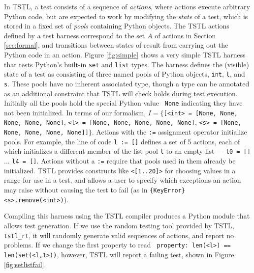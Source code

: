 In TSTL, a test consists of a sequence of
\emph{actions}, where actions execute arbitrary Python code, but are
expected to work by modifying the \emph{state} of a test, which is
stored in a fixed set of \emph{pools} containing Python objects.  The
TSTL actions defined by a test harness correspond to the set $A$ of
actions in Section \ref{sec:formal}, and transitions between states of
result from carrying out the Python code in an action.  Figure
\ref{fig:simple} shows a very simple TSTL harness that tests Python's
built-in {\tt set} and {\tt list} types.  The harness defines the
(visible) state of a test as consisting of three named pools of Python
objects, {\tt int}, {\tt l}, and {\tt s}.  These pools have no
inherent associated type, though a type can be annotated as an
additional constraint that TSTL will check holds during test
execution.  Initially all the pools hold the special Python value {\tt
  None} indicating they have not been initialized.  In terms of our formalism,
$I = \{${\tt [<int> = [None, None, None, None, None]}, {\tt <l> =
  [None, None, None, None, None]}, {\tt <s> = [None, None, None, None,
  None]]}$\}$.  Actions with the {\tt :=} assignment operator
initialize pools.  For example, the line of code {\tt l := []} defines a set of 5
actions, each of which initializes a different member of the list pool
{\tt l} to an empty list --- {\tt l0 = []} ... {\tt l4 = []}.  Actions
without a {\tt :=} require that pools used in them already be
initialized.  TSTL provides constructs like {\tt <[1..20]>} for
choosing values in a range for use in a test, and allows a user to
specify which exceptions an action may raise without causing the test
to fail (as in {\tt \{KeyError\} <s>.remove(<int>)}).

Compiling this harness using
the TSTL compiler produces a Python module that allows test
generation.  If we use the random testing tool provided by TSTL, {\tt
  tstl\_rt}, it will randomly generate valid sequences of actions, and
report no problems.  If we change the first property to read {\tt
  property: len(<l>) == len(set(<l,1>))}, however, TSTL will report a
failing test, shown in Figure \ref{fig:setlistfail}.

